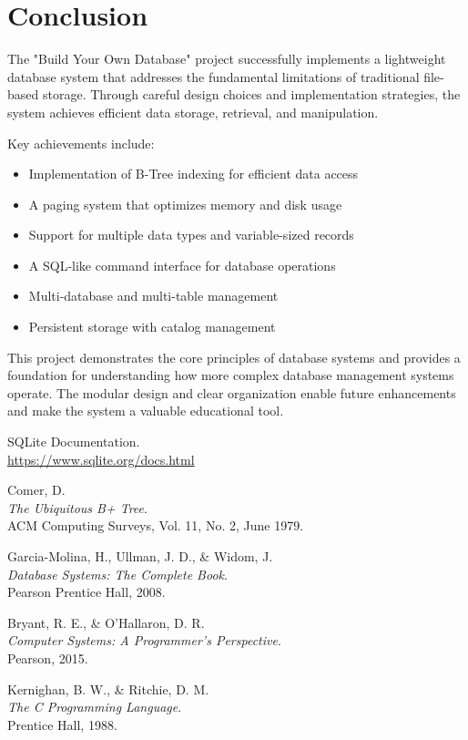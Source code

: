 \documentclass[12pt,a4paper]{article}  %
\begin{document}
\section{Conclusion}

The "Build Your Own Database" project successfully implements a lightweight database system that addresses the fundamental limitations of traditional file-based storage. Through careful design choices and implementation strategies, the system achieves efficient data storage, retrieval, and manipulation.

Key achievements include:

\begin{itemize}
    \item Implementation of B-Tree indexing for efficient data access
    \item A paging system that optimizes memory and disk usage
    \item Support for multiple data types and variable-sized records
    \item A SQL-like command interface for database operations
    \item Multi-database and multi-table management
    \item Persistent storage with catalog management
\end{itemize}

This project demonstrates the core principles of database systems and provides a foundation for understanding how more complex database management systems operate. The modular design and clear organization enable future enhancements and make the system a valuable educational tool.

\begin{thebibliography}{9}

    SQLite Documentation.\\
    \url{https://www.sqlite.org/docs.html}
    
    Comer, D.\\
    \textit{The Ubiquitous B+ Tree}.\\
    ACM Computing Surveys, Vol. 11, No. 2, June 1979.
    
    Garcia-Molina, H., Ullman, J. D., \& Widom, J.\\
    \textit{Database Systems: The Complete Book}.\\
    Pearson Prentice Hall, 2008.
    
    Bryant, R. E., \& O'Hallaron, D. R.\\
    \textit{Computer Systems: A Programmer's Perspective}.\\
    Pearson, 2015.
    
    Kernighan, B. W., \& Ritchie, D. M.\\
    \textit{The C Programming Language}.\\
    Prentice Hall, 1988.
    
    \end{thebibliography}
    
\end{document}
